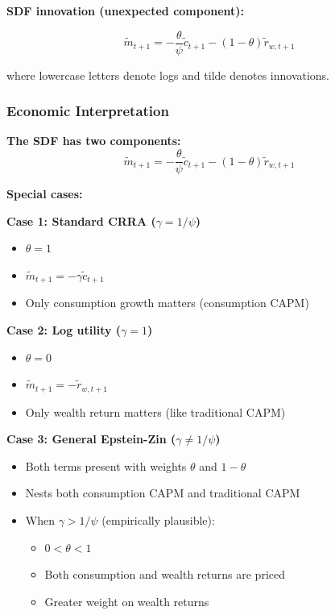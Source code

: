 \documentclass{beamer}
\begin{document}
\begin{frame}[allowframebreaks]
    \textbf{SDF innovation (unexpected component):}
    \begin{tcolorbox}[colback=green!5!white, colframe=green!75!black, title=SDF Innovation (Wealth Return Form)]
    \begin{equation}
        \tilde{m}_{t+1} = -\frac{\theta}{\psi} \tilde{c}_{t+1} - (1-\theta) \tilde{r}_{w,t+1}\label{消费、财富形式的SDF}
    \end{equation}
    \end{tcolorbox}
    
    where lowercase letters denote logs and tilde denotes innovations.
    
\end{frame}


\begin{frame}[allowframebreaks]
    \frametitle{Economic Interpretation}
    
    \textbf{The SDF has two components:}
    \begin{equation*}
        \tilde{m}_{t+1} = -\frac{\theta}{\psi} \tilde{c}_{t+1} - (1-\theta) \tilde{r}_{w,t+1}
    \end{equation*}

    \textbf{Special cases:}
    
    \textbf{Case 1: Standard CRRA ($\gamma = 1/\psi$)}
    \begin{itemize}
        \item $\theta = 1$
        \item $\tilde{m}_{t+1} = -\gamma\tilde{c}_{t+1}$
        \item Only consumption growth matters (consumption CAPM)
    \end{itemize}
    
    \textbf{Case 2: Log utility ($\gamma = 1$)}
    \begin{itemize}
        \item $\theta = 0$
        \item $\tilde{m}_{t+1} = -\tilde{r}_{w,t+1}$
        \item Only wealth return matters (like traditional CAPM)
    \end{itemize}
    
    \framebreak
    
    \textbf{Case 3: General Epstein-Zin ($\gamma \neq 1/\psi$)}
    \begin{itemize}
        \item Both terms present with weights $\theta$ and $1-\theta$
        \item Nests both consumption CAPM and traditional CAPM
        \item When $\gamma > 1/\psi$ (empirically plausible):
        \begin{itemize}
            \item $0 < \theta < 1$
            \item Both consumption and wealth returns are priced
            \item Greater weight on wealth returns
        \end{itemize}
    \end{itemize}
 \end{frame}
\end{document}
